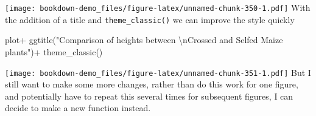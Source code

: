 \documentclass[
]{book}
\newenvironment{Shaded}{\begin{snugshade}}{\end{snugshade}}
\newcommand{\FunctionTok}[1]{\textcolor[rgb]{0.00,0.00,0.00}{#1}}
\newcommand{\NormalTok}[1]{#1}
\newcommand{\SpecialCharTok}[1]{\textcolor[rgb]{0.00,0.00,0.00}{#1}}
\newcommand{\StringTok}[1]{\textcolor[rgb]{0.31,0.60,0.02}{#1}}
\begin{document}
\texttt{[image: bookdown-demo\_files/figure-latex/unnamed-chunk-350-1.pdf]}
With the addition of a title and \texttt{theme\_classic()} we can improve the style quickly

\begin{Shaded}
\begin{Highlighting}[]
\NormalTok{plot}\SpecialCharTok{+}
  \FunctionTok{ggtitle}\NormalTok{(}\StringTok{"Comparison of heights between }\SpecialCharTok{\textbackslash{}n}\StringTok{Crossed and Selfed Maize plants"}\NormalTok{)}\SpecialCharTok{+}
  \FunctionTok{theme\_classic}\NormalTok{()}
\end{Highlighting}
\end{Shaded}

\texttt{[image: bookdown-demo\_files/figure-latex/unnamed-chunk-351-1.pdf]}
But I still want to make some more changes, rather than do this work for one figure, and potentially have to repeat this several times for subsequent figures, I can decide to make a new function instead.
\end{document}
